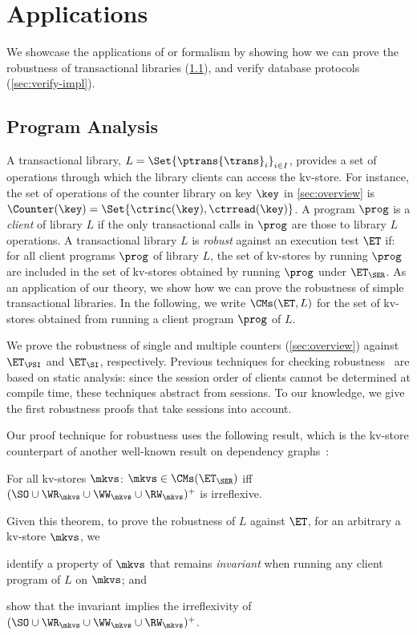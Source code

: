 \section{Applications}
\label{sec:applications}

We showcase the applications of or formalism by showing how we can prove the robustness of transactional libraries (\cref{sec:program-analysis}), and verify database protocols
 (\cref{sec:verify-impl}).

\subsection{Program Analysis}
\label{sec:program-analysis}
A transactional library, $L = \Set{\ptrans{\trans}_{i}}_{i \in I}$, 
provides a set of operations through which the library clients can access the kv-store. 
For instance, the set of operations of the counter library on key $\key$ in \cref{sec:overview} is $\Counter(\key) = \Set{\ctrinc(\key), \ctrread(\key)}$.
A program $\prog$ is a \emph{client} of library $L$ if the only transactional calls in $\prog$ are those to library $L$ operations.  
A transactional library $L$ is \emph{robust} against an execution test $\ET$ if: 
for all client programs $\prog$ of library $L$, the set of kv-stores by running $\prog$ are included in the set of kv-stores obtained by running $\prog$ under $\ET_{\SER}$.
As an application of our theory, we show how we can prove the robustness of simple transactional libraries. 
In the following, we write $\CMs(\ET, L)$ for the set of kv-stores obtained from running a client program $\prog$ of $L$. 

We prove the robustness of single and multiple counters (\cref{sec:overview}) against $\ET_{\PSI}$ and $\ET_{\SI}$, respectively.
Previous techniques for checking robustness~\cite{giovanni_concur16,SIanalysis,laws,sureshConcur} 
are based on static analysis: since the session order of clients cannot be determined at compile 
time, these techniques abstract from sessions. 
To our knowledge, we give the first robustness proofs that take sessions into account.

Our proof technique for robustness uses the following result, which is the kv-store counterpart of another well-known result on dependency graphs~\cite{adya}:
\begin{theorem}
\label{thm:serialisable_nocycle}
For all kv-stores $\mkvs$: $\mkvs \in \CMs(\ET_{\SER})$ iff $(\SO \cup \WR_{\mkvs} 
\cup \WW_{\mkvs} \cup \RW_{\mkvs})^{+}$ is irreflexive.
\end{theorem}
Given this theorem, to prove the robustness of $L$ against $\ET$, 
for an arbitrary a kv-store $\mkvs$, we 
\begin{enumerate*}
	\item identify a property of $\mkvs$ that remains \emph{invariant} when running any client program of $L$ on $\mkvs$; and 
	\item show that the invariant implies the irreflexivity of $(\SO \cup \WR_{\mkvs} \cup \WW_{\mkvs} \cup \RW_{\mkvs})^{+}$.
\end{enumerate*}

